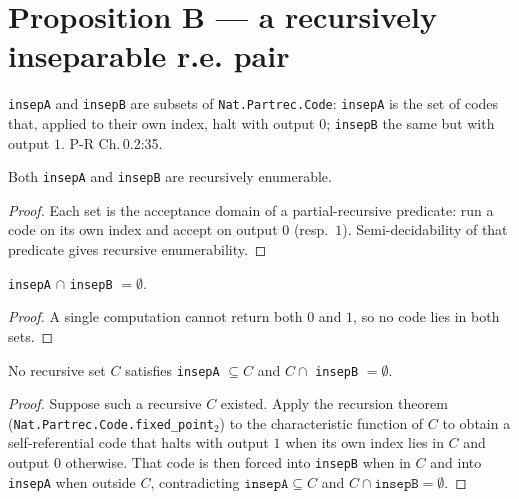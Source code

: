 \section{Proposition B — a recursively inseparable r.e. pair}

\begin{definition}
  \label{def:insepAB}
  \leanok
  \texttt{insepA} and \texttt{insepB} are subsets of \texttt{Nat.Partrec.Code}: \texttt{insepA} is the set of codes that, applied to their own index, halt with output $0$; \texttt{insepB} the same but with output $1$. P-R Ch.\,0.2:35.
\end{definition}

\begin{lemma}
  \label{lem:insep_re}
  \leanok
  Both \texttt{insepA} and \texttt{insepB} are recursively enumerable.
\end{lemma}
\begin{proof}\leanok
  Each set is the acceptance domain of a partial-recursive predicate: run a code
  on its own index and accept on output $0$ (resp.\ $1$). Semi-decidability of
  that predicate gives recursive enumerability.
\end{proof}

\begin{lemma}
  \label{lem:insep_disjoint}
  \leanok
  \texttt{insepA} $\cap$ \texttt{insepB} $= \emptyset$.
\end{lemma}
\begin{proof}\leanok
  A single computation cannot return both $0$ and $1$, so no code lies in both
  sets.
\end{proof}

\begin{theorem}
  \label{thm:insep_no_separator}
  \leanok
  No recursive set $C$ satisfies \texttt{insepA} $\subseteq C$ and $C \cap$ \texttt{insepB} $= \emptyset$.
\end{theorem}
\begin{proof}\leanok
  Suppose such a recursive $C$ existed. Apply the recursion theorem
  (\texttt{Nat.Partrec.Code.fixed\_point}$_2$) to the characteristic function of
  $C$ to obtain a self-referential code that halts with output $1$ when its own
  index lies in $C$ and output $0$ otherwise. That code is then forced into
  \texttt{insepB} when in $C$ and into \texttt{insepA} when outside $C$,
  contradicting $\texttt{insepA} \subseteq C$ and $C \cap \texttt{insepB} = \emptyset$.
\end{proof}


